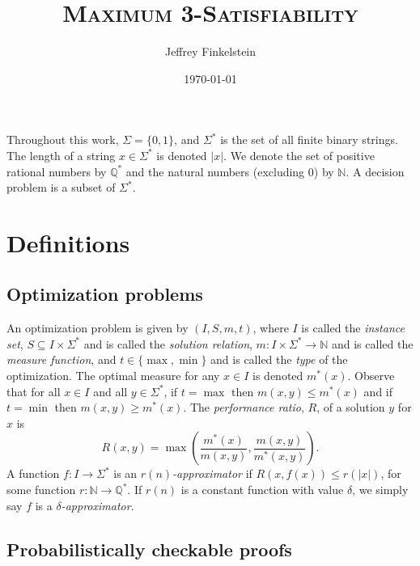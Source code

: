 \documentclass[]{article}
\author{Jef{}frey Finkelstein}
\date{\today}
\title{\texorpdfstring{\textsc{Maximum 3-Satisfiability}}{Maximum 3-Satisfiability}}
\theoremstyle{plain}
\theoremstyle{definition}
\begin{document}
\maketitle

Throughout this work, $\Sigma=\{0, 1\}$, and $\Sigma^*$ is the set of all finite binary strings.
The length of a string $x \in \Sigma^*$ is denoted $|x|$.
We denote the set of positive rational numbers by $\mathbb{Q}^*$ and the natural numbers (excluding 0) by $\mathbb{N}$.
A decision problem is a subset of $\Sigma^*$.

\section{Definitions}

\subsection{Optimization problems}

An optimization problem is given by $(I, S, m, t)$, where $I$ is called the \emph{instance set}, $S \subseteq I \times \Sigma^*$ and is called the \emph{solution relation}, $m \colon I \times \Sigma^* \to \mathbb{N}$ and is called the \emph{measure function}, and $t\in\{\max, \min\}$ and is called the \emph{type} of the optimization.
The optimal measure for any $x \in I$ is denoted $m^*(x)$.
Observe that for all $x \in I$ and all $y \in \Sigma^*$, if $t = \max$ then $m(x, y) \leq m^*(x)$ and if $t = \min$ then $m(x, y) \geq m^*(x)$.
The \emph{performance ratio}, $R$, of a solution $y$ for $x$ is
\begin{displaymath}
  R(x, y) = \max{\left(\frac{m^*(x)}{m(x, y)}, \frac{m(x, y)}{m^*(x, y)}\right)}.
\end{displaymath}
A function $f \colon I \to \Sigma^*$ is an \emph{$r(n)$-approximator} if $R(x, f(x)) \leq r(|x|)$, for some function $r \colon \mathbb{N} \to \mathbb{Q}^*$.
If $r(n)$ is a constant function with value $\delta$, we simply say $f$ is a \emph{$\delta$-approximator}.

\subsection{Probabilistically checkable proofs}
\end{document}
